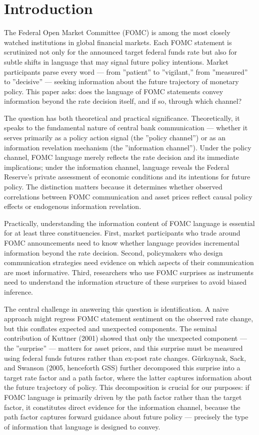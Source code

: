 \documentclass[12pt]{article}
\begin{document}
\section{Introduction}

The Federal Open Market Committee (FOMC) is among the most closely watched institutions in global financial markets. Each FOMC statement is scrutinized not only for the announced target federal funds rate but also for subtle shifts in language that may signal future policy intentions. Market participants parse every word --- from ''patient'' to ''vigilant,'' from ''measured'' to ''decisive'' --- seeking information about the future trajectory of monetary policy. This paper asks: does the language of FOMC statements convey information beyond the rate decision itself, and if so, through which channel?

The question has both theoretical and practical significance. Theoretically, it speaks to the fundamental nature of central bank communication --- whether it serves primarily as a policy action signal (the ''policy channel'') or as an information revelation mechanism (the ''information channel''). Under the policy channel, FOMC language merely reflects the rate decision and its immediate implications; under the information channel, language reveals the Federal Reserve's private assessment of economic conditions and its intentions for future policy. The distinction matters because it determines whether observed correlations between FOMC communication and asset prices reflect causal policy effects or endogenous information revelation.

Practically, understanding the information content of FOMC language is essential for at least three constituencies. First, market participants who trade around FOMC announcements need to know whether language provides incremental information beyond the rate decision. Second, policymakers who design communication strategies need evidence on which aspects of their communication are most informative. Third, researchers who use FOMC surprises as instruments need to understand the information structure of these surprises to avoid biased inference.

The central challenge in answering this question is identification. A naive approach might regress FOMC statement sentiment on the observed rate change, but this conflates expected and unexpected components. The seminal contribution of Kuttner (2001) showed that only the unexpected component --- the ''surprise'' --- matters for asset prices, and this surprise must be measured using federal funds futures rather than ex-post rate changes. Gürkaynak, Sack, and Swanson (2005, henceforth GSS) further decomposed this surprise into a target rate factor and a path factor, where the latter captures information about the future trajectory of policy. This decomposition is crucial for our purposes: if FOMC language is primarily driven by the path factor rather than the target factor, it constitutes direct evidence for the information channel, because the path factor captures forward guidance about future policy --- precisely the type of information that language is designed to convey.
\end{document}
